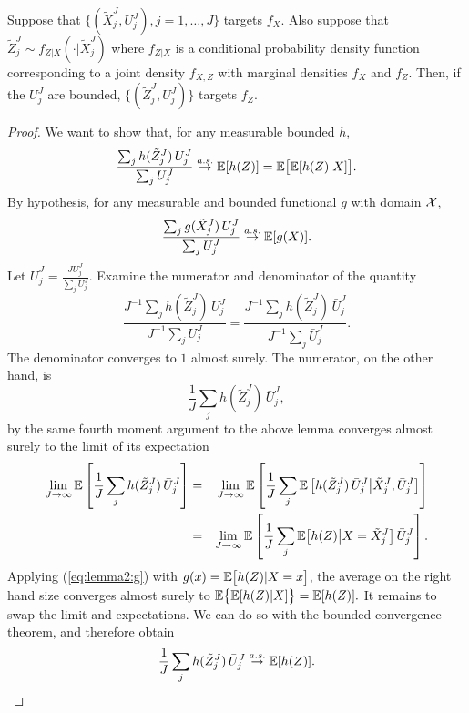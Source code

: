 \documentclass{article}
\begin{document}
\begin{lem}
    \label{lem:marginal-proper-weights}
    Suppose that $\{(\tilde X_j^J,U_j^J),j=1,\dots,J\}$ targets $f_X$. Also suppose that $\tilde Z_j^J \sim f_{Z|X}(\cdot | \tilde X_j^J)$ where $f_{Z|X}$ is a conditional probability density function corresponding to a joint density $f_{X,Z}$ with marginal densities $f_X$ and $f_Z$. Then, if the $U_j^J$ are bounded, $\{(\tilde Z_j^J,U_j^J)\}$ targets $f_Z$.
\end{lem}
\begin{proof}
    We want to show that, for any measurable bounded $h$, 
     $$\frac{\sum_j h(\tilde Z_j^J) \, U_j^J}{\sum_j U_j^J} \stackrel{a.s.}{\to} \mathbb{E}[h(Z)] = \mathbb{E}\big[\mathbb{E}[h(Z) | X]\big].$$
    By hypothesis, for any measurable and bounded functional $g$ with domain ${\mathcal{X}}$,
    \begin{equation}\label{eq:lemma2:g}
    \frac{\sum_j g(\tilde X_j^J)\, U_j^J}{\sum_j U_j^J} \stackrel{a.s.}{\to} \mathbb{E}[g(X)].
    \end{equation}
    Let $\bar{U}_j^J = \frac{J U_j^J}{\sum_j U_j^J}$. Examine the numerator and denominator of the quantity $$\frac{J^{-1}\sum_j h(\tilde Z_j^J) \, U_j^J}{J^{-1}\sum_j U_j^J} = \frac{J^{-1}\sum_j h(\tilde Z_j^J) \, \bar{U}_j^J}{J^{-1}\sum_j \bar{U}_j^J}.$$
    The denominator converges to $1$ almost surely. The numerator, on the other hand, is
    $$\frac{1}{J}\sum_j h(\tilde Z_j^J)\, \bar{U}_j^J,$$
    by the same fourth moment argument to the above lemma converges almost surely to the limit of its expectation
    \begin{eqnarray*}        
    \lim_{J\to\infty} \mathbb{E}\left[\frac{1}{J}\sum_j h(\tilde Z_j^J)\, \bar{U}_j^J\right] 
    &=& \lim_{J\to\infty} \mathbb{E} \left[\frac{1}{J}\sum_j  
      \mathbb{E}\left[ h(\tilde Z_j^J)\, \bar{U}_j^J\big|\tilde X_j^J, \bar U_j^J\right]
    \right]
    \\
    &=& \lim_{J\to\infty} \mathbb{E} \left[\frac{1}{J}\sum_j  \mathbb{E}\big[h(Z) \big| X=\tilde X_j^J \big] \, \bar U_j^J\right].
    \end{eqnarray*}
    Applying (\ref{eq:lemma2:g}) with $g(x) = \mathbb{E}\big[h(Z) | X=x\big]$, the average on the right hand size converges almost surely to $\mathbb{E}\big\{\mathbb{E}[h(Z)|X]\big\}=\mathbb{E}[h(Z)].$
    It remains to swap the limit and expectations. We can do so with the bounded convergence theorem, and therefore obtain   
    $$\frac{1}{J}\sum_j h(\tilde Z_j^J)\,\bar{U}_j^J \stackrel{a.s.}{\to} \mathbb{E}[h(Z)].$$ 
    
\end{proof}
\end{document}

